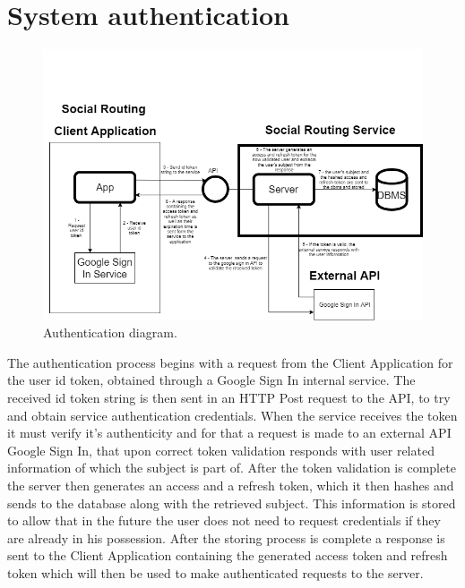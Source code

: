         \section{System authentication}
        \vspace{-\baselineskip}
        \begin{figure}[h]            
            \includegraphics[width=\textwidth]{images/project-structure/authentication-diagram.PNG}
            \caption{Authentication diagram.}
            \label{fig:authenticationdiagram}
        \end{figure} 
        The authentication process begins with a request from the Client Application for the user id token, obtained through a Google Sign In internal service.
        The received id token string is then sent in an HTTP Post request to the API, to try and obtain service authentication credentials.
        When the service receives the token it must verify it's authenticity and for that a request is made to an external API Google Sign In, that
        upon correct token validation responds with user related information of which the subject is part of. After the token validation is complete
        the server then generates an access and a refresh token, which it then hashes and sends to the database along with the retrieved subject. 
        This information is stored to allow that in the future the user does not need to request credentials if they are already in his possession.
        After the storing process is complete a response is sent to the Client Application containing the generated access token and refresh token
        which will then be used to make authenticated requests to the server. 
